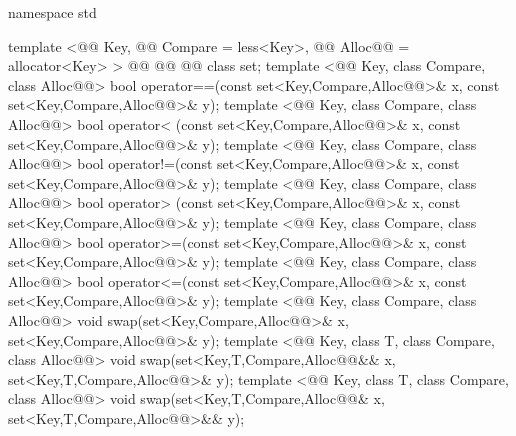 \documentclass[american,twoside]{book}
\begin{document}
\begin{codeblock}
namespace std {
  template <@@ Key, @@ Compare = less<Key>,
            @@ Alloc@@ = allocator<Key> >
    @@
             @@
             @@
    class set;
  template <@@ Key, class Compare, class Alloc@@>
    bool operator==(const set<Key,Compare,Alloc@@>& x,
                    const set<Key,Compare,Alloc@@>& y);
  template <@@ Key, class Compare, class Alloc@@>
    bool operator< (const set<Key,Compare,Alloc@@>& x,
                    const set<Key,Compare,Alloc@@>& y);
  template <@@ Key, class Compare, class Alloc@@>
    bool operator!=(const set<Key,Compare,Alloc@@>& x,
                    const set<Key,Compare,Alloc@@>& y);
  template <@@ Key, class Compare, class Alloc@@>
    bool operator> (const set<Key,Compare,Alloc@@>& x,
                    const set<Key,Compare,Alloc@@>& y);
  template <@@ Key, class Compare, class Alloc@@>
    bool operator>=(const set<Key,Compare,Alloc@@>& x,
                    const set<Key,Compare,Alloc@@>& y);
  template <@@ Key, class Compare, class Alloc@@>
    bool operator<=(const set<Key,Compare,Alloc@@>& x,
                    const set<Key,Compare,Alloc@@>& y);
  template <@@ Key, class Compare, class Alloc@@>
    void swap(set<Key,Compare,Alloc@@>& x,
              set<Key,Compare,Alloc@@>& y);
  template <@@ Key, class T, class Compare, class Alloc@@>
    void swap(set<Key,T,Compare,Alloc@@&& x,
              set<Key,T,Compare,Alloc@@>& y);
  template <@@ Key, class T, class Compare, class Alloc@@>
    void swap(set<Key,T,Compare,Alloc@@& x,
              set<Key,T,Compare,Alloc@@>&& y);

}
\end{codeblock}
\end{document}
